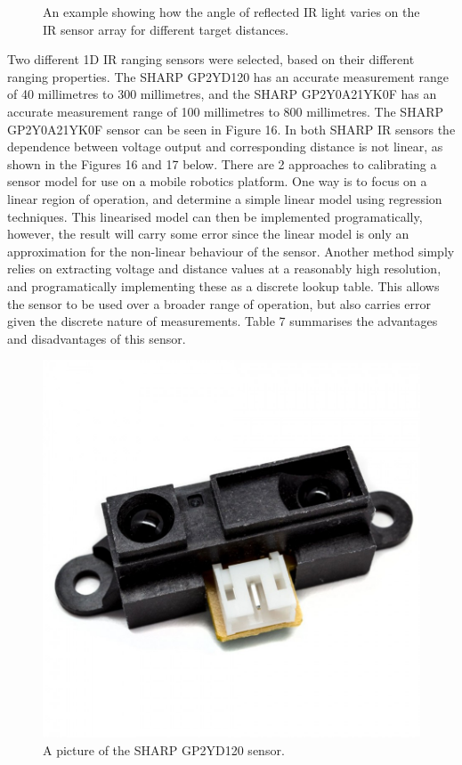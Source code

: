 \documentclass[a4paper]{article}
\begin{document}
\begin{figure}[h]
\begin{minipage}[t]{0.45\textwidth}
\caption{An example showing how the angle of reflected IR light varies on the IR sensor array for different target distances.}
\end{minipage}
\end{figure}

Two different 1D IR ranging sensors were selected, based on their different ranging properties. The SHARP GP2YD120 has an accurate measurement range of 40 millimetres to 300 millimetres, and the SHARP GP2Y0A21YK0F has an accurate measurement range of 100 millimetres to 800 millimetres. The SHARP GP2Y0A21YK0F sensor can be seen in Figure 16. In both SHARP IR sensors the dependence between voltage output and corresponding distance is not linear, as shown in the Figures 16 and 17 below. There are 2 approaches to calibrating a sensor model for use on a mobile robotics platform. One way is to focus on a linear region of operation, and determine a simple linear model using regression techniques. This linearised model can then be implemented programatically, however, the result will carry some error since the linear model is only an approximation for the non-linear behaviour of the sensor. Another method simply relies on extracting voltage and distance values at a reasonably high resolution, and programatically implementing these as a discrete lookup table. This allows the sensor to be used over a broader range of operation, but also carries error given the discrete nature of measurements. Table 7 summarises the advantages and disadvantages of this sensor.
\vspace{-2cm}
\begin{figure}
\centering
\includegraphics[scale=0.1]{sharp_sensor}
\caption{A picture of the SHARP GP2YD120 sensor.}
\end{figure}
\end{document}
